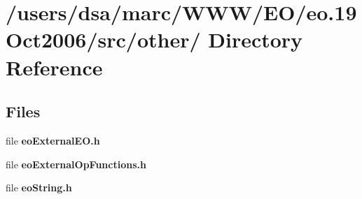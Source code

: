 \section{/users/dsa/marc/WWW/EO/eo.19Oct2006/src/other/ Directory Reference}
\label{dir_000014}
\subsection*{Files}
\begin{CompactItemize}
\item 
file {\bf eoExternalEO.h}
\item 
file {\bf eoExternalOpFunctions.h}
\item 
file {\bf eoString.h}
\end{CompactItemize}
